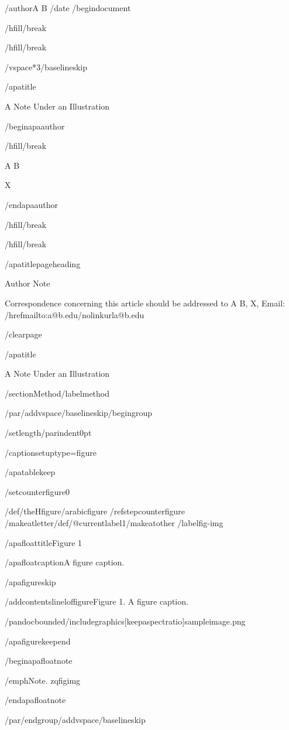 /author{A B}
/date{}
/begin{document}


/hfill/break

/hfill/break

/vspace*{3/baselineskip}

/apatitle{

A Note Under an Illustration

}

/begin{apaauthor}

/hfill/break

A B

X

/end{apaauthor}

/hfill/break

/hfill/break

/apatitlepageheading{

Author Note

}

Correspondence concerning this article should be addressed to A
B, X, Email: /href{mailto:a@b.edu}{/nolinkurl{a@b.edu}}

/clearpage

/apatitle{

A Note Under an Illustration

}

/section{Method}/label{method}

/par/addvspace{/baselineskip}/begingroup

/setlength{/parindent}{0pt}

/captionsetup{type=figure}

/apatablekeep

/setcounter{figure}{0}

/def/theHfigure{/arabic{figure}}%
/refstepcounter{figure}%
/makeatletter/def/@currentlabel{1}/makeatother%
/label{fig-img}

/apafloattitle{Figure 1}

/apafloatcaption{A figure caption.}

/apafigureskip

/addcontentsline{lof}{figure}{Figure 1. A figure caption.}

/pandocbounded{/includegraphics[keepaspectratio]{sampleimage.png}}

/apafigurekeepend

/begin{apafloatnote}

/emph{Note}. zqfigimg

/end{apafloatnote}

/par/endgroup/addvspace{/baselineskip}

